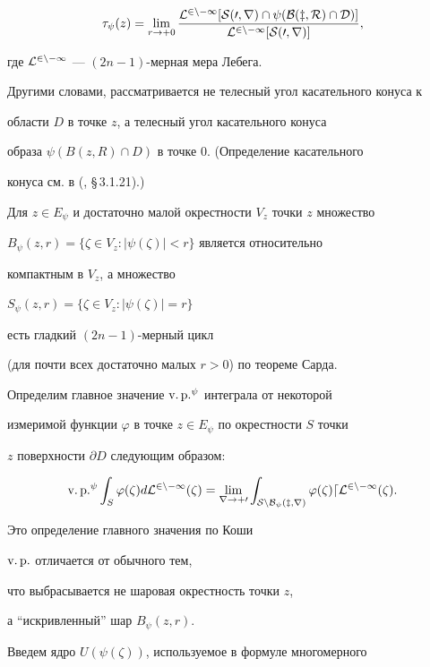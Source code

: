 $$


\tau_\psi(z)=\lim_{r\to+0}\frac{\cal L^{2n-1}[S(0,r)\cap \psi(B(z,R)\cap D)]}


{\cal L^{2n-1}[S(0,r)]},


$$


где $\cal L^{2n-1}$ --- $(2n-1)$-мерная мера Лебега.


Другими словами, рассматривается не телесный угол касательного конуса к


области $D$ в точке $z$, а телесный угол касательного конуса


образа $\psi(B(z,R)\cap D)$ в точке 0. (Определение касательного 


конуса см. в (\cite{Fed}, \S\,3.1.21).)





Для $z\in E_\psi$ и достаточно малой окрестности $V_z$ точки $z$ множество


$B_\psi(z,r)=\{\zeta\in V_z:|\psi(\zeta)|<r\}$ является относительно


компактным в $V_z$, а множество


$S_\psi(z,r)=\{\zeta\in V_z:|\psi(\zeta)|=r\}$


есть гладкий $(2n-1)$-мерный цикл


(для почти всех достаточно малых $r>0$) по теореме Сарда.





Определим главное значение $\text{v.\,p.}^\psi$ интеграла от некоторой


измеримой функции $\varphi$ в точке $z\in E_\psi$ по окрестности $S$ точки


$z$ поверхности $\partial D$ следующим образом:


$$


\text{v.\,p.}^\psi \int_S\varphi(\zeta)d\cal L^{2n-1}(\zeta)=\lim_{r\to+0}


\int_{S\setminus B_\psi(z,r)}\varphi(\zeta)d\cal L^{2n-1}(\zeta).


$$


Это определение  главного значения по Коши


$\text{v.\,p.}$ отличается от обычного тем,


что выбрасывается не шаровая окрестность точки $z$,


а ``искривленный'' шар $B_\psi(z,r)$.





Введем ядро $U(\psi(\zeta))$, используемое в формуле многомерного


